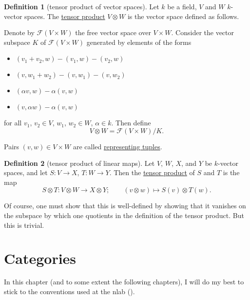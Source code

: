 \documentclass[a4paper,10pt]{scrreprt}
\newcommand{\defn}[1]{\ul{#1}}
\theoremstyle{definition}
\newtheorem{definition}{Definition}[section]
\theoremstyle{plain}
\theoremstyle{remark}
\begin{document}
\begin{definition}[tensor product of vector spaces]
  \label{def:tensorproductofvectorspaces}
  Let $k$ be a field, $V$ and $W$ $k$-vector spaces. The \defn{tensor product} $V \otimes W$ is the vector space defined as follows.

  Denote by $\mathcal{F}(V \times W)$ the free vector space over $V \times W$. Consider the vector subspace $K$ of $\mathcal{F}(V \times W)$ generated by elements of the forms 
  \begin{itemize}
    \item $(v_{1} + v_{2}, w) - (v_{1}, w) - (v_{2}, w)$
    \item $(v, w_{1} + w_{2}) - (v, w_{1}) - (v, w_{2})$
    \item $(\alpha v, w) - \alpha (v, w)$
    \item $(v, \alpha w) - \alpha (v, w)$
  \end{itemize}
  for all $v_{1}$, $v_{2} \in V$, $w_{1}$, $w_{2} \in W$, $\alpha \in k$. Then define
  \begin{equation*}
    V \otimes W = \mathcal{F}(V \times W) / K.
  \end{equation*}

  Pairs $(v, w) \in V \times W$ are called \defn{representing tuples}.
\end{definition}

\begin{definition}[tensor product of linear maps]
  \label{def:tensorproductoflinearmaps}
  Let $V$, $W$, $X$, and $Y$ be $k$-vector spaces, and let $S\colon V \to X$, $T\colon W \to Y$. Then the \defn{tensor product} of $S$ and $T$ is the map
  \begin{equation*}
    S \otimes T\colon V \otimes W \to X \otimes Y;\qquad (v \otimes w) \mapsto S(v) \otimes T(w).
  \end{equation*}

  Of course, one must show that this is well-defined by showing that it vanishes on the subspace by which one quotients in the definition of the tensor product. But this is trivial.
\end{definition}

\chapter{Categories} 
In this chapter (and to some extent the following chapters), I will do my best to stick to the conventions used at the nlab (\cite{nlab}).
\end{document}
